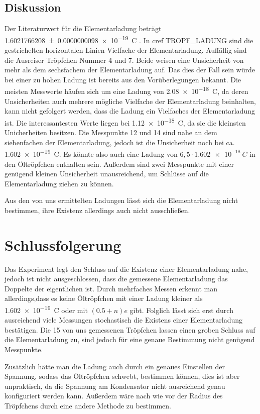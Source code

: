 \documentclass[
	a4paper,
	12pt,
	pagesize,
	ngerman
]{scrartcl}
\begin{document}
	\subsection{Diskussion}
	Der Literaturwert für die Elementarladung beträgt \SI{1,6021766208 \pm 0,0000000098 e-19}{C} \cite{Elementarladung}.
	In cref TROPF_LADUNG sind die gestrichelten horizontalen Linien Vielfache der Elementarladung.
	Auffällig sind die Ausreiser Tröpfchen Nummer 4 und 7. 
	Beide weisen eine Unsicherheit von mehr als dem sechsfachem der Elementarladung auf. 
	Das dies der Fall sein würde bei einer zu hohen Ladung ist bereits aus den Vorüberlegungen bekannt.
	Die meisten Messwerte häufen sich um  eine Ladung von \SI{2,08e-18}{C}, da deren Unsicherheiten auch mehrere mögliche Vielfache der Elementarladung beinhalten, kann nicht gefolgert werden, dass die Ladung ein Vielfaches der Elementarladung ist.
	Die interessantesten Werte liegen bei \SI{1,12e-18}{C}, da sie die kleinsten Unicherheiten besitzen.
	Die Messpunkte 12 und 14 sind nahe an dem siebenfachen der Elementarladung, jedoch ist die Unsicherheit noch bei ca. \SI{1,602e-19}{C}.
	Es könnte also auch eine Ladung von $6,5 \cdot \SI{1,602e-18}{C}$ in den Öltröpfchen enthalten sein.
	Außerdem sind zwei Messpunkte mit einer genügend kleinen Unsicherheit unausreichend, um Schlüsse auf die Elementarladung ziehen zu können.


	Aus den von uns ermittelten Ladungen lässt sich die Elementarladung nicht bestimmen, ihre Existenz allerdings auch nicht ausschließen.

	
	\section{Schlussfolgerung}
	Das Experiment legt den Schluss auf die Existenz einer Elementarladung nahe, jedoch ist nicht ausgeschlossen, dass die gemessene Elementarladung das Doppelte der eigentlichen ist. 
	Durch mehrfaches Messen erkennt man allerdings,dass es keine Öltröpfchen mit einer Ladung kleiner als \SI{1,602e-19}{C} oder mit $(0.5+n)e$ gibt. 
	Folglich lässt sich erst durch ausreichend viele Messungen stochastisch die Existens einer Elementarladung bestätigen.
	Die 15 von uns gemessenen Tröpfchen lassen einen groben Schluss auf die Elementarladung zu, sind jedoch für eine genaue Bestimmung nicht genügend Messpunkte.

	Zusätzlich hätte man die Ladung auch durch ein genaues Einstellen der Spannung, sodass das Öltröpfchen schwebt, bestimmen können, dies ist aber unpraktisch, da die Spannung am Kondensator nicht ausreichend genau konfiguriert werden kann.
	Außerdem wäre nach wie vor der Radius des Tröpfchens durch eine andere Methode zu bestimmen.
\end{document}
